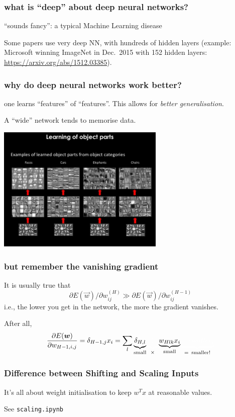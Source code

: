 \documentclass[USenglish,pdftex,compress,10pt,svgnamesi,handout]{beamer}
\newcommand{\bfw}{\Vec{w}}
\def\hid{{H}}
\begin{document}
\begin{frame}
    \frametitle{what is ``deep'' about deep neural networks?}
   ``sounds fancy'': a typical Machine Learning disease
 
Some papers use very deep NN, with hundreds of hidden layers (example: Microsoft winning ImageNet in Dec.\ 2015 with 152 hidden layers: \url{https://arxiv.org/abs/1512.03385}).
\end{frame}


\begin{frame}
    \frametitle{why do deep neural networks work better?}

one learns ``features'' of ``features''.  This allows for \textsl{better generalisation}.

A ``wide'' network tends to memorise data.

\includegraphics[width=8cm]{pics/Tmu9G.jpg}
\end{frame}


\def\i#1{\textcolor{white}{#1}}

\begin{frame}
\frametitle{but remember the vanishing gradient}
It is usually true that 
$$  \partial E(\bfw) / \partial w_{ij}^{(\hid)}
  \gg
    \partial E(\bfw) / \partial w_{ij}^{(\hid-1)}
$$
i.e., the lower you get in the network, the more the gradient vanishes.

After all,
$$
{\partial E(\bfw)  \over \partial w_{\hid-1,i,j} }
    = \delta_{\hid-1,j} x_i 
    = \sum_l {\underbrace{\textcolor{black}{\delta_{\hid,l}}}_{\mathrm{small}}}
    	\i{\underbrace{{}_l^(}_{\textcolor{black}{\times}}}
	{\underbrace{ \textcolor{black}{w_{Hlk} x_i }}_{\mathrm{small}}}
	\i{\underbrace{=smaller_l^(}_{\textcolor{black}{=\,\,\,\mathrm{smaller!}}}}
$$\end{frame}



\begin{frame}
    \frametitle{Difference between Shifting and Scaling Inputs}
    It's all about weight initialisation to keep $w^T x$ at reasonable values.
    
See \texttt{scaling.ipynb}
\end{frame}
\end{document}
